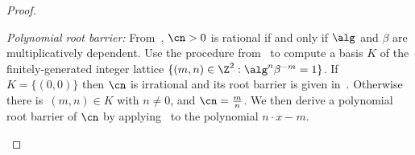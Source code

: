 \begin{proof}
\begin{description}
    \textit{Polynomial root barrier:} From~,
    $\cn > 0$ is rational if and only if $\alg$ and $\beta$ are multiplicatively dependent. Use the procedure from~\cite{CaiLZ00} 
    to compute a basis $K$ of the finitely-generated integer lattice $\{(m,n) \in \Z^2 : \alg^n \beta^{-m} = 1\}$. If $K =
    \{(0,0)\}$ then $\cn$ is irrational and its root barrier is given in~. Otherwise there is~$(m,n) \in K$ with $n \neq 0$, and
    $\cn = \frac{m}{n}$. We then derive a polynomial
    root barrier of $\cn$ by applying~ to the polynomial $n \cdot x - m$.
    \qedhere
  \end{description}
\end{proof}




